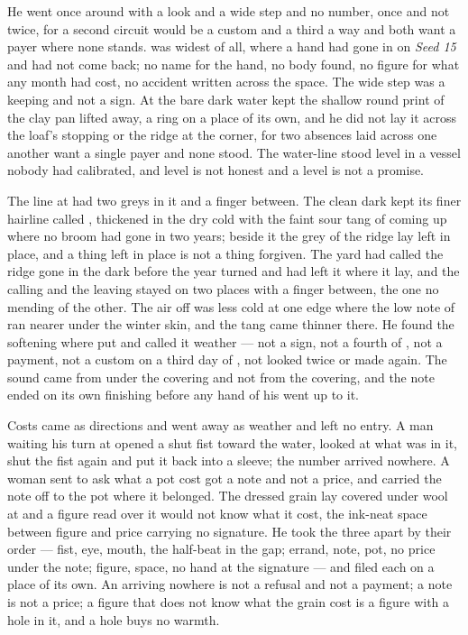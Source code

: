 He went once around  with a look and a wide step and no number, once and not twice, for a second circuit would be a custom and a third a way and both want a payer where none stands.  was widest of all, where a hand had gone in on \emph{Seed 15} and had not come back; no name for the hand, no body found, no figure for what any month had cost, no accident written across the space. The wide step was a keeping and not a sign. At  the bare dark water kept the shallow round print of the clay pan lifted away, a ring on a place of its own, and he did not lay it across the loaf's stopping or the ridge at the corner, for two absences laid across one another want a single payer and none stood. The water-line stood level in a vessel nobody had calibrated, and level is not honest and a level is not a promise.

The line at  had two greys in it and a finger between. The clean dark kept its finer hairline called , thickened in the dry cold with the faint sour tang of  coming up where no broom had gone in two years; beside it the grey of the ridge lay left in place, and a thing left in place is not a thing forgiven. The yard had called the ridge gone in the dark before the year turned and had left it where it lay, and the calling and the leaving stayed on two places with a finger between, the one no mending of the other. The air off  was less cold at one edge where the low note of  ran nearer under the winter skin, and the tang came thinner there. He found the softening where put and called it weather --- not a sign, not a fourth of , not a payment, not a custom on a third day of , not looked twice or made again. The sound came from under the covering and not from the covering, and the note ended on its own finishing before any hand of his went up to it.

Costs came as directions and went away as weather and left no entry. A man waiting his turn at  opened a shut fist toward the water, looked at what was in it, shut the fist again and put it back into a sleeve; the number arrived nowhere. A woman sent to ask what a pot cost got a note and not a price, and carried the note off to the pot where it belonged. The dressed grain lay covered under wool at  and a figure read over it would not know what it cost, the ink-neat space between figure and price carrying no signature. He took the three apart by their order --- fist, eye, mouth, the half-beat in the gap; errand, note, pot, no price under the note; figure, space, no hand at the signature --- and filed each on a place of its own. An arriving nowhere is not a refusal and not a payment; a note is not a price; a figure that does not know what the grain cost is a figure with a hole in it, and a hole buys no warmth.

